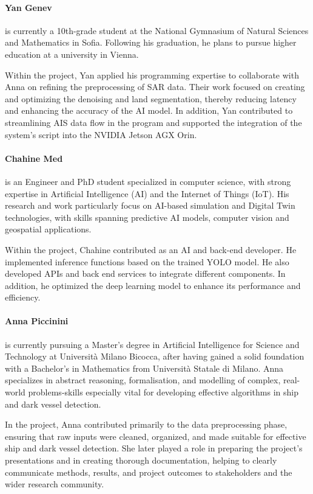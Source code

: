\documentclass{article}
\begin{document}
	
	\paragraph{Yan Genev} is currently a 10th-grade student at the National Gymnasium of Natural Sciences and Mathematics in Sofia. Following his graduation, he plans to pursue higher education at a university in Vienna.
	
	Within the project, Yan applied his programming expertise to collaborate with Anna on refining the preprocessing of SAR data. Their work focused on creating and optimizing the denoising and land segmentation, thereby reducing latency and enhancing the accuracy of the AI model. In addition, Yan contributed to streamlining AIS data flow in the program and supported the integration of the system’s script into the NVIDIA Jetson AGX Orin.
	
	\paragraph{Chahine Med}  is an Engineer and PhD student specialized in computer science, with strong expertise in Artificial Intelligence (AI) and the Internet of Things (IoT). His research and work particularly focus on AI-based simulation and Digital Twin technologies, with skills spanning predictive AI models, computer vision and geospatial applications. 
	
	Within the project, Chahine contributed as an AI and back-end developer. He implemented inference functions based on the trained YOLO model. He also developed APIs and back end services to integrate different components. In addition, he optimized the deep learning model to enhance its performance and efficiency.
	
	
	\paragraph{Anna Piccinini} is currently pursuing a Master’s degree in Artificial Intelligence for Science and Technology at Università Milano Bicocca, after having gained a solid foundation with a Bachelor’s in Mathematics from Università Statale di Milano. Anna specializes in abstract reasoning, formalisation, and modelling of complex, real-world problems-skills especially vital for developing effective algorithms in ship and dark vessel detection.

	In the project, Anna contributed primarily to the data preprocessing phase, ensuring that raw inputs were cleaned, organized, and made suitable for effective ship and dark vessel detection. She later played a role in preparing the project’s presentations and in creating thorough documentation, helping to clearly communicate methods, results, and project outcomes to stakeholders and the wider research community.
	
\end{document}

